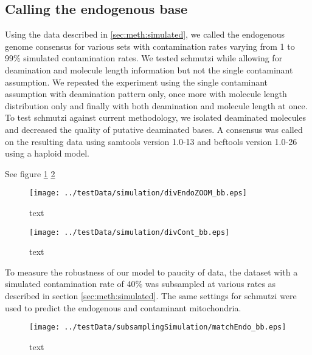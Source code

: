 \documentclass[a4paper,12pt]{article}
\begin{document}
\begin{itemize}
\begin{itemize}
\clearpage

\subsection{Calling the endogenous base}

Using the data described in \ref{sec:meth:simulated}, we called the endogenous genome consensus for various sets with contamination rates varying from 1 to 99\% simulated contamination rates. We tested schmutzi while allowing for deamination and molecule length information but not the single contaminant assumption. We repeated the experiment using the single contaminant assumption with deamination pattern only, once more with molecule length distribution only and finally with both deamination and molecule length at once. To test schmutzi against current methodology, we isolated deaminated molecules and decreased the quality of putative deaminated bases. A consensus was called on the resulting data using samtools version 1.0-13 and bcftools version 1.0-26  using a haploid model.

See figure \ref{fig:endocallingendo} \ref{fig:endocallingcont}

\begin{figure}[H]
\centering
\texttt{[image: ../testData/simulation/divEndoZOOM\_bb.eps]} 
\caption{text}
\label{fig:endocallingendo}
\end{figure}

\begin{figure}[H]
\centering
\texttt{[image: ../testData/simulation/divCont\_bb.eps]} 
\caption{text}
\label{fig:endocallingcont}
\end{figure}




To measure the robustness of our model to paucity of data, the dataset with a simulated contamination rate of 40\% was subsampled at various rates as described in section \ref{sec:meth:simulated}. The same settings for schmutzi were used to predict the endogenous and contaminant mitochondria. 


\begin{figure}[H]
\centering
\texttt{[image: ../testData/subsamplingSimulation/matchEndo\_bb.eps]} 
\caption{text}
\label{fig:endocallingSUBendo}
\end{figure}



\end{itemize}
\end{itemize}
\end{document}
